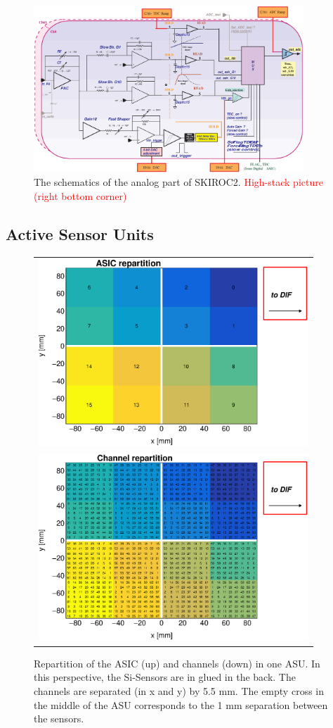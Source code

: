 \documentclass[a4paper,11pt]{article}
\newcommand{\todo}[1]{\textcolor{red}{{#1}}}
\begin{document}
\begin{figure}[!t]
  \centering
    \includegraphics[width=4in]{figs/skiroc2_block.eps}
\caption{The schematics of the analog part of SKIROC2. \todo{High-stack picture (right bottom corner)}}
\label{SKIROC2}
\end{figure}

\subsection{Active Sensor Units}
\label{sec:ASU}

\begin{figure}[!t]
  \centering
  \begin{tabular}{l}
    \includegraphics[width=4in]{figs/ASU_geometry1.eps}  \\
    \includegraphics[width=4in]{figs/ASU_geometry2.eps}  \\
  \end{tabular}
  \caption{Repartition of the ASIC (up) and channels (down) in one ASU. In this perspective, the Si-Sensors are in glued in the back. The channels are separated (in x and y) by 5.5 mm.
    The empty cross in the middle of the ASU corresponds to the 1 mm separation between the sensors.}
\label{ASU}
\end{figure}
\end{document}
